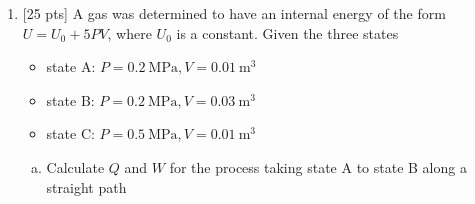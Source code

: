 \begin{enumerate}
\begin{enumerate}[(a)]

    \end{enumerate}

    \pagebreak

  \item {[25 pts]} A gas was determined to have an internal energy of
    the form $U = U_0 + 5PV$, where $U_0$ is a constant. Given the
    three states
    \begin{itemize}[\textbullet]
      \item state A: $P = \SI{0.2}{\mega\pascal},  V =
        \SI{0.01}{\meter\cubed}$
      \item state B: $P = \SI{0.2}{\mega\pascal}, V = \SI{0.03}{\meter\cubed}$
      \item state C: $P = \SI{0.5}{\mega\pascal}, V = \SI{0.01}{\meter\cubed}$
    \end{itemize}


    \begin{enumerate}[(a)]

        \pagebreak

      \item Calculate $Q$ and $W$ for the process taking state A to
        state B along a straight path


\end{enumerate}
\end{enumerate}

